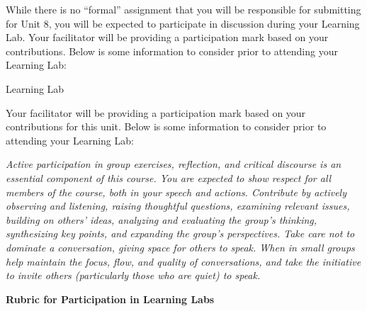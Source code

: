 \documentclass[
]{book}
\begin{document}
\begin{assessment}
While there is no ``formal'' assignment that you will be responsible for submitting for Unit 8, you will be expected to participate in discussion during your Learning Lab. Your facilitator will be providing a participation mark based on your contributions. Below is some information to consider prior to attending your Learning Lab:

{Learning Lab}

Your facilitator will be providing a participation mark based on your contributions for this unit. Below is some information to consider prior to attending your Learning Lab:

\emph{Active participation in group exercises, reflection, and critical discourse is an essential component of this course. You are expected to show respect for all members of the course, both in your speech and actions. Contribute by actively observing and listening, raising thoughtful questions, examining relevant issues, building on others' ideas, analyzing and evaluating the group's thinking, synthesizing key points, and expanding the group's perspectives. Take care not to dominate a conversation, giving space for others to speak. When in small groups help maintain the focus, flow, and quality of conversations, and take the initiative to invite others (particularly those who are quiet) to speak.}

\textbf{Rubric for Participation in Learning Labs}


\end{assessment}
\end{document}
